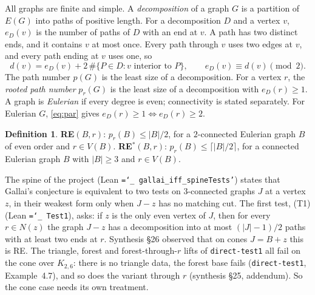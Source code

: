 \documentclass[11pt]{amsart}
\theoremstyle{definition}
\newtheorem{definition}[theorem]{Definition}
\newcommand{\pr}{p_r}
\newcommand{\lean}[1]{\texttt{\hyphenchar\font=`\_ #1}}
\begin{document}
All graphs are finite and simple. A \emph{decomposition} of a graph $G$ is a partition of $E(G)$ into
paths of positive length. For a decomposition $D$ and a vertex $v$, $e_D(v)$ is the number of paths of
$D$ with an end at $v$. A path has two distinct ends, and it contains $v$ at most once. Every path
through $v$ uses two edges at $v$, and every path ending at $v$ uses one, so
\begin{equation}\label{eq:par}
d(v) = e_D(v) + 2\,\#\{P\in D: v \text{ interior to } P\}, \qquad e_D(v)\equiv d(v) \pmod 2 .
\end{equation}
The path number $p(G)$ is the least size of a decomposition. For a vertex $r$, the \emph{rooted path
number} $\pr(G)$ is the least size of a decomposition with $e_D(r)\ge 1$. A graph is \emph{Eulerian}
if every degree is even; connectivity is stated separately. For Eulerian $G$, \eqref{eq:par} gives
$e_D(r)\ge 1 \iff e_D(r)\ge 2$.

\begin{definition}
\textbf{RE}$(B,r)$: $\pr(B)\le |B|/2$, for a $2$-connected Eulerian graph $B$ of even order and $r\in
V(B)$. \textbf{RE$^*$}$(B,r)$: $\pr(B)\le\lceil |B|/2\rceil$, for a connected Eulerian graph $B$ with
$|B|\ge 3$ and $r\in V(B)$.
\end{definition}

The spine of the project (Lean \lean{gallai\_iff\_spineTests'}) states that Gallai's conjecture is
equivalent to two tests on $3$-connected graphs $J$ at a vertex $z$, in their weakest form only when
$J-z$ has no matching cut. The first test, (T1) (Lean \lean{Test1}), asks: if $z$ is the only even
vertex of $J$, then for every $r\in N(z)$ the graph $J-z$ has a decomposition into at most
$(|J|-1)/2$ paths with at least two ends at $r$. Synthesis \S26 observed that on cones $J=B+z$ this is
RE. The triangle, forest and forest-through-$r$ lifts of \texttt{direct-test1} all fail on the cone
over $K_{2,6}$: there is no triangle data, the forest base fails (\texttt{direct-test1}, Example~4.7),
and so does the variant through $r$ (synthesis \S25, addendum). So the cone case needs its own
treatment.
\end{document}
